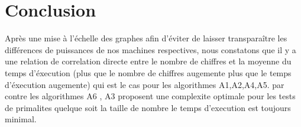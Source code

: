 \chapter{Conclusion}

Après une mise à l'échelle des graphes afin d'éviter de laisser transparaître les différences de puissances de nos machines respectives, nous constatons que il y a une relation de correlation directe entre le nombre de chiffres et la moyenne du temps d'éxecution (plus que le nombre de chiffres augemente plus que le temps d'éxecution augemente) qui est le cas pour les algorithmes A1,A2,A4,A5. par contre les algorithmes A6 , A3 proposent une complexite optimale pour les tests de primalites quelque soit la taille de nombre le temps d'execution est toujours minimal. 
